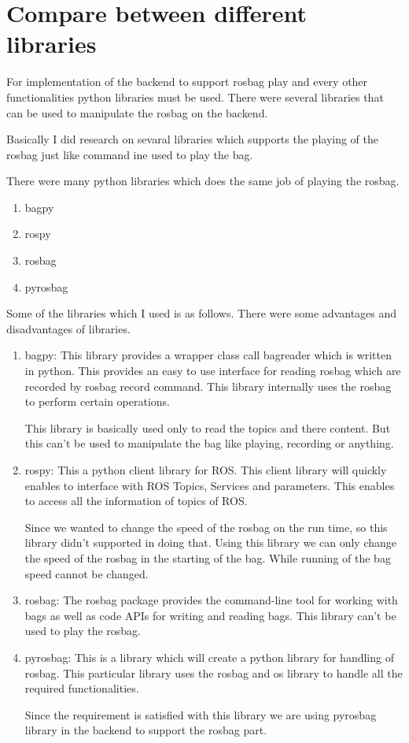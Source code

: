 \section{Compare between different libraries}
For implementation of the backend to support rosbag play and every other functionalities python libraries must be used. There were several libraries that can be used to manipulate the rosbag on the backend. 

Basically I did research on sevaral libraries which supports the playing of the rosbag just like command ine used to play the bag.

There were many python libraries which does the same job of playing the rosbag.

\begin{enumerate}
	\item bagpy
	\item rospy
	\item rosbag
	\item pyrosbag
\end{enumerate} 
Some of the libraries which I used is as follows. There were some advantages and disadvantages of libraries.
\begin{enumerate}
	\item bagpy: This library provides a wrapper class call bagreader which is written in python. This provides an easy to use interface for reading rosbag which are recorded by rosbag record command. This library internally uses the rosbag to perform certain operations. 
	
	This library is basically used only to read the topics and there content. But this can't be used to manipulate the bag like playing, recording or anything.

	
	\item rospy: This a python client library for ROS. This client library will quickly enables to interface with ROS Topics, Services and parameters. This enables to access all the information of topics of ROS.
	
	Since we wanted to change the speed of the rosbag on the run time, so this library didn't supported in doing that. Using this library we can only change the speed of the rosbag in the starting of the bag. While running of the bag speed cannot be changed.
	
	\item rosbag: The rosbag package provides the command-line tool for working with bags as well as code APIs for writing and reading bags. This library can't be used to play the rosbag.
	
	\item pyrosbag: This is a library which will create a python library for handling of rosbag. This particular library uses the rosbag and os library to handle all the required functionalities. 
	
	Since the requirement is satisfied with this library we are using pyrosbag library in the backend to support the rosbag part.
\end{enumerate}

